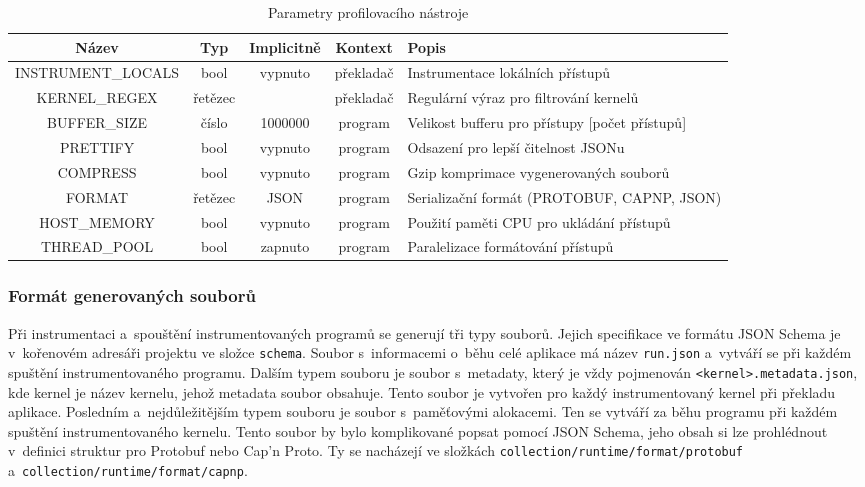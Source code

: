 \begin{table}[h]
\centering
\bgroup
\def\arraystretch{1.2}
\begin{tabularx}{\textwidth}{|c|c|c|c|Y|}
\hline
\textbf{Název} & \textbf{Typ} & \textbf{Implicitně} & \textbf{Kontext} & \textbf{Popis} \\
\hline
INSTRUMENT\_LOCALS & bool & vypnuto & překladač & Instrumentace lokálních přístupů \\
\hline
KERNEL\_REGEX & řetězec & & překladač & Regulární výraz pro filtrování kernelů \\
\hline
BUFFER\_SIZE & číslo & 1000000 & program & Velikost bufferu pro přístupy [počet přístupů] \\
\hline
PRETTIFY & bool & vypnuto & program & Odsazení pro lepší čitelnost JSONu \\
\hline
COMPRESS & bool & vypnuto & program & Gzip komprimace vygenerovaných souborů \\
\hline
FORMAT & řetězec & JSON & program & Serializační formát (PROTOBUF, CAPNP, JSON) \\
\hline
HOST\_MEMORY & bool & vypnuto & program & Použití paměti CPU pro ukládání přístupů \\
\hline
THREAD\_POOL & bool & zapnuto & program & Paralelizace formátování přístupů \\
\hline
\end{tabularx}
\egroup
\caption{Parametry profilovacího nástroje}
\label{tab:parameters}
\end{table}

\subsubsection{Formát generovaných souborů}
Při instrumentaci a~spouštění instrumentovaných programů se generují tři typy souborů. Jejich specifikace ve formátu JSON Schema je v~kořenovém adresáři projektu ve složce \texttt{schema}. Soubor s~informacemi o~běhu celé aplikace má název \texttt{run.json} a~vytváří se při každém spuštění instrumentovaného programu. Dalším typem souboru je soubor s~metadaty, který je vždy pojmenován \texttt{<kernel>.metadata.json}, kde kernel je název kernelu, jehož metadata soubor obsahuje. Tento soubor je vytvořen pro každý instrumentovaný kernel při překladu aplikace. Posledním a~nejdůležitějším typem souboru je soubor s~paměťovými alokacemi. Ten se vytváří za běhu programu při každém spuštění instrumentovaného kernelu. Tento soubor by bylo komplikované popsat pomocí JSON Schema, jeho obsah si lze prohlédnout v~definici struktur pro Protobuf nebo Cap'n Proto. Ty se nacházejí ve složkách \texttt{collection/runtime/format/protobuf} a~\texttt{collection/runtime/format/capnp}.

